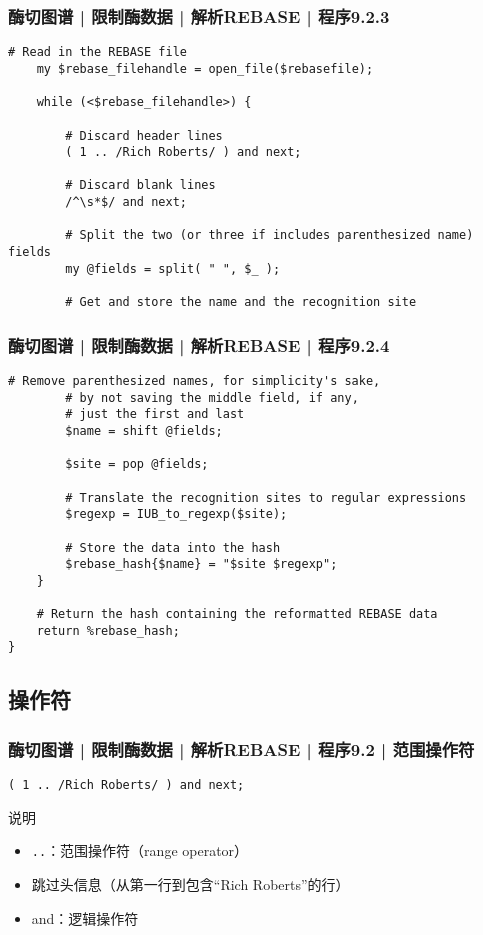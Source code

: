 \begin{frame}[fragile]
  \frametitle{酶切图谱 | 限制酶数据 | 解析REBASE | 程序9.2.3}
\begin{lstlisting}[firstnumber=23,basicstyle=\small\tt,numberstyle=\footnotesize]
    # Read in the REBASE file
    my $rebase_filehandle = open_file($rebasefile);

    while (<$rebase_filehandle>) {

        # Discard header lines
        ( 1 .. /Rich Roberts/ ) and next;

        # Discard blank lines
        /^\s*$/ and next;

        # Split the two (or three if includes parenthesized name) fields
        my @fields = split( " ", $_ );

        # Get and store the name and the recognition site
\end{lstlisting}
\end{frame}

\begin{frame}[fragile]
  \frametitle{酶切图谱 | 限制酶数据 | 解析REBASE | 程序9.2.4}
\begin{lstlisting}[firstnumber=37,basicstyle=\footnotesize\tt,numberstyle=\scriptsize]
        # Remove parenthesized names, for simplicity's sake,
        # by not saving the middle field, if any,
        # just the first and last
        $name = shift @fields;

        $site = pop @fields;

        # Translate the recognition sites to regular expressions
        $regexp = IUB_to_regexp($site);

        # Store the data into the hash
        $rebase_hash{$name} = "$site $regexp";
    }

    # Return the hash containing the reformatted REBASE data
    return %rebase_hash;
}
\end{lstlisting}
\end{frame}

\subsection{操作符}
\begin{frame}[fragile]
  \frametitle{酶切图谱 | 限制酶数据 | 解析REBASE | 程序9.2 | \alert{范围操作符}}
\begin{lstlisting}
( 1 .. /Rich Roberts/ ) and next;
\end{lstlisting}
\pause
\begin{block}{说明}
  \begin{itemize}
    \item \verb|..|：范围操作符（range operator）
    \item 跳过头信息（从第一行到包含“Rich Roberts”的行）
    \item and：逻辑操作符
  \end{itemize}
\end{block}
\end{frame}

